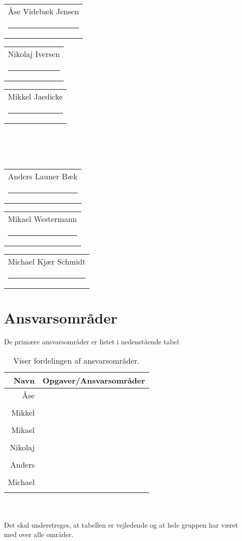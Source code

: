 




\vspace{3cm}
{
\newcommand{\namesigdate}[2][5cm]{%
  \begin{tabular}{@{}p{#1}@{}}
    #2 \\[2\normalbaselineskip] \hrule \\[0pt]
  \end{tabular}
}
\begin{changemargin}{-1cm}{-1cm}
\centering
\noindent \namesigdate{Åse Videbæk Jensen} \hspace{1cm} \namesigdate{Nikolaj Iversen} \hspace{1cm} \namesigdate{Mikkel Jaedicke} \\~\\~\\
\centering
\noindent \namesigdate{Anders Launer Bæk} \hspace{1cm}  \namesigdate{Mikael Westermann} \hspace{1cm}   \namesigdate{Michael Kjær Schmidt}
\end{changemargin}
}
\bigskip
\section*{Ansvarsområder}
De primære ansvarsområder er listet i nedenstående tabel
\bigskip
\begin{table}[!th]
\centering
\setlength{\extrarowheight}{5pt}
 \begin{tabular}{r|l}
Navn&Opgaver/Ansvarsområder \\[6pt] \hline
Åse&\\
&\\[6pt] \hline
Mikkel&\\ 
&\\[6pt] \hline
Mikael&\\
&\\[6pt] \hline
Nikolaj&\\
&\\[6pt] \hline
Anders&\\
&\\[6pt] \hline
Michael & \\
&\\ 
\end{tabular}     
\caption*{Viser fordelingen af ansvarsområder.}            
\end{table}\\~\\ 
Det skal understreges, at tabellen er vejledende og at hele gruppen har været med over alle områder.
